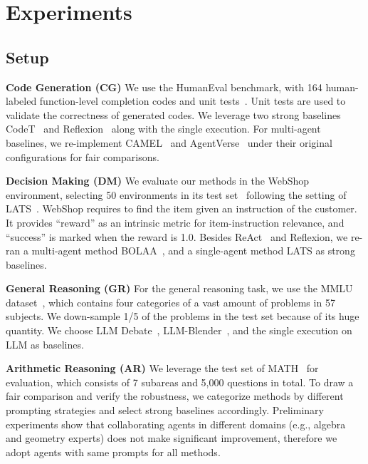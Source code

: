 \documentclass{article} %
\begin{document}
\section{Experiments}\label{sec:exps}

\subsection{Setup}\label{sec:exps-setup}

\textbf{Code Generation (CG)}
We use the HumanEval benchmark, with 164 human-labeled function-level completion codes and unit tests~\citep{human-eval}. Unit tests are used to validate the correctness of generated codes. 
We leverage two strong baselines CodeT~\citep{chen2023codet} and Reflexion~\citep{reflexion} along with the single execution. For multi-agent baselines, we re-implement CAMEL~\citep{li2023camel} and AgentVerse~\citep{chen2023agentverse} under their original configurations for fair comparisons.

\noindent
\textbf{Decision Making (DM)}
We evaluate our methods in the WebShop environment, selecting 50 environments in its test set~\citep{human-eval} following the setting of LATS~\citep{lats}. WebShop requires to find the item given an instruction of the customer. It provides ``reward'' as an intrinsic metric for item-instruction relevance, and ``success'' is marked when the reward is 1.0. Besides ReAct~\citep{yao2023react} and Reflexion, we re-ran a multi-agent method BOLAA~\citep{bolaa}, and a single-agent method LATS as strong baselines. 

\noindent
\textbf{General Reasoning (GR)}
For the general reasoning task, we use the MMLU dataset~\citep{mmlu}, which contains four categories of a vast amount of problems in 57 subjects. We down-sample 1/5 of the problems in the test set because of its huge quantity. 
We choose LLM Debate~\citep{debate1-mit}, LLM-Blender~\citep{blender}, and the single execution on LLM as baselines. 

\noindent
\textbf{Arithmetic Reasoning (AR)}
We leverage the test set of MATH~\citep{hendrycksmath2021} for evaluation, which consists of 7 subareas and 5,000 questions in total.  
To draw a fair comparison and verify the robustness, we categorize methods by different prompting strategies and select strong baselines accordingly.
Preliminary experiments show that collaborating agents in different domains (e.g., algebra and geometry experts) does not make significant improvement, therefore we adopt agents with same prompts for all methods. 
\end{document}
